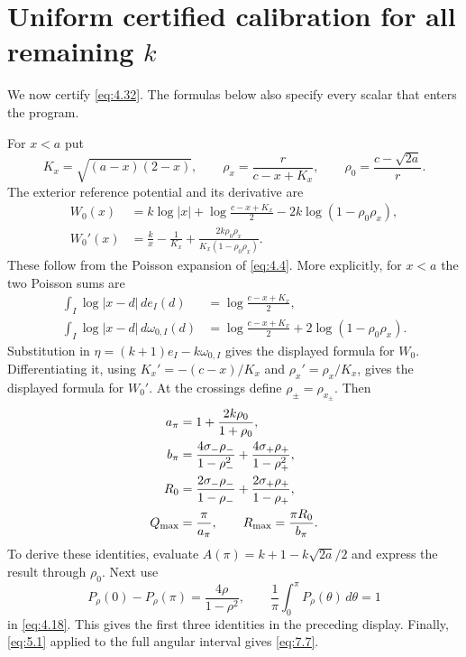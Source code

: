\documentclass[11pt]{article}
\numberwithin{equation}{section}
\theoremstyle{plain}
\theoremstyle{definition}
\theoremstyle{remark}
\newcommand{\1}{\mathbf 1}
\newcommand{\dd}{\,d}
\begin{document}
\section{Uniform certified calibration for all remaining
\texorpdfstring{$k$}{k}}\label{sec:calibration}

We now certify \eqref{eq:4.32}.  The formulas below also specify every scalar that
enters the program.

For $x<a$ put
\[
 K_x=\sqrt{(a-x)(2-x)},\qquad
 \rho_x=\frac{r}{c-x+K_x},\qquad
 \rho_0=\frac{c-\sqrt{2a}}r.
\]
The exterior reference potential and its derivative are
\begin{align*}
W_0(x)&=k\log|x|+\log\frac{c-x+K_x}{2}
       -2k\log(1-\rho_0\rho_x),\\
W_0'(x)&=\frac{k}{x}-\frac1{K_x}
 +\frac{2k\rho_0\rho_x}{K_x(1-\rho_0\rho_x)}.
\end{align*}
These follow from the Poisson expansion of \eqref{eq:4.4}.  More explicitly, for
$x<a$ the two Poisson sums are
\[
\begin{aligned}
 \int_I\log|x-d|\dd e_I(d)
   &=\log\frac{c-x+K_x}{2},\\
 \int_I\log|x-d|\dd\omega_{0,I}(d)
   &=\log\frac{c-x+K_x}{2}
     +2\log(1-\rho_0\rho_x).
\end{aligned}
\]
Substitution in $\eta=(k+1)e_I-k\omega_{0,I}$ gives the displayed formula for
$W_0$.  Differentiating it, using $K_x'=-(c-x)/K_x$ and
$\rho_x'=\rho_x/K_x$, gives the displayed formula for $W_0'$.  At the crossings define
$\rho_\pm=\rho_{x_\pm}$.  Then
\begin{align}
a_\pi&=1+\frac{2k\rho_0}{1+\rho_0},\notag\\
b_\pi&=\frac{4\sigma_-\rho_-}{1-\rho_-^2}
      +\frac{4\sigma_+\rho_+}{1-\rho_+^2},\notag\\
R_0&=\frac{2\sigma_-\rho_-}{1-\rho_-}
      +\frac{2\sigma_+\rho_+}{1-\rho_+},\notag\\
Q_{\max}&=\frac\pi{a_\pi},\qquad
R_{\max}=\frac{\pi R_0}{b_\pi}.
\label{eq:7.7}
\end{align}
To derive these identities, evaluate
$A(\pi)=k+1-k\sqrt{2a}/2$ and express the result through $\rho_0$.
Next use
\[
 P_\rho(0)-P_\rho(\pi)=\frac{4\rho}{1-\rho^2},
\qquad
 \frac1\pi\int_0^\pi P_\rho(\theta)\dd\theta=1
\]
in \eqref{eq:4.18}.  This gives the first three identities in the preceding
display.  Finally, \eqref{eq:5.1} applied to the full angular interval gives
\eqref{eq:7.7}.
\end{document}
